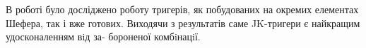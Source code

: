\documentclass[a4paper,14pt]{extreport}
\begin{document}
 \begin{figure}[h!]
 
	  \end{figure}
\clearpage 
\newpage
\begin{center}
\textbf{}
\end{center}

В роботі було досліджено роботу тригерів, як побудованих на окремих
елементах Шефера, так і вже готових. Виходячи з результатів саме JK-тригери є найкращим удосконаленням вiд за-
бороненої комбiнацiї.



 
 \begin{figure}[h!]
 
	  \end{figure}
\end{document}
